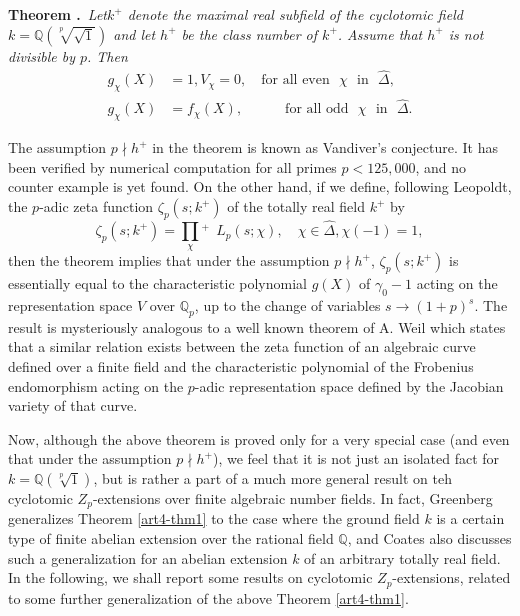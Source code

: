 \medskip
\noindent
{\bf Theorem .\label{art4-thm1}}~{\em Let\pageoriginale $k^{+}$ denote the maximal real subfield of the cyclotomic field $k=\mathbb{Q}(\sqrt[p]{\sqrt{1}})$ and let $h^{+}$ be the class number of $k^{+}$. Assume that $h^{+}$ is not divisible by $p$. Then}
\begin{align*}
g_{\chi}(X) &= 1, V_{\chi}=0,\quad\!\text{for all even~ } \chi\text{~ in~ }\widehat{\Delta},\\[3pt]
g_{\chi}(X) &= f_{\chi}(X),\qquad \text{~~~for all odd~ } \chi \text{~ in~ }\widehat{\Delta}.
\end{align*}

The assumption $p\nmid h^{+}$ in the theorem is known as Vandiver's conjecture. It has been verified by numerical computation for all primes $p<125,000$, and no counter example is yet found. On the other hand, if we define, following Leopoldt, the $p$-adic zeta function $\zeta_{p}(s;k^{+})$ of the totally real field $k^{+}$ by
$$
\zeta_{p}(s;k^{+})=\prod\limits_{\chi}{}^{+} \ \ L_{p}(s;\chi),\quad \chi\in \widehat{\Delta}, \chi(-1)=1,
$$
then the theorem implies that under the assumption $p\nmid h^{+}$, $\zeta_{p}(s;k^{+})$ is essentially equal to the characteristic polynomial $g(X)$ of $\gamma_{0}-1$ acting on the representation space $V$ over $\mathbb{Q}_{p}$, up to the change of variables $s\to (1+p)^{s}$. The result is mysteriously analogous to a well known theorem of A. Weil which states that a similar relation exists between the zeta function of an algebraic curve defined over a finite field and the characteristic polynomial of the Frobenius endomorphism acting on the $p$-adic representation space defined by the Jacobian variety of that curve.

Now, although the above theorem is proved only for a very special case (and even that under the assumption $p\nmid h^{+}$), we feel that it is not just an isolated fact for $k=\mathbb{Q}(\sqrt[p]{1})$, but is rather a part of a much more general result on teh cyclotomic $Z_{p}$-extensions over finite algebraic number fields. In fact, Greenberg \cite{art4-key2} generalizes Theorem \ref{art4-thm1} to the case where the ground field $k$ is a certain type of finite abelian extension over the rational field $\mathbb{Q}$, and Coates \cite{art4-key1} also discusses such a generalization for an abelian extension $k$ of an arbitrary totally real field. In the following, we shall report some results on cyclotomic $Z_{p}$-extensions, related to some further generalization of the above Theorem \ref{art4-thm1}.

